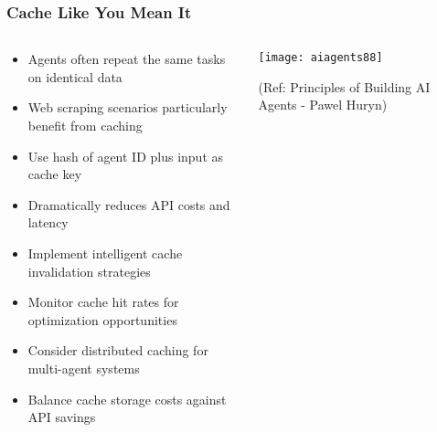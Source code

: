 \begin{frame}[fragile]\frametitle{Cache Like You Mean It}
\begin{columns}
    \begin{column}[T]{0.6\linewidth}
      \begin{itemize}
		\item Agents often repeat the same tasks on identical data
		\item Web scraping scenarios particularly benefit from caching
		\item Use hash of agent ID plus input as cache key
		\item Dramatically reduces API costs and latency
		\item Implement intelligent cache invalidation strategies
		\item Monitor cache hit rates for optimization opportunities
		\item Consider distributed caching for multi-agent systems
		\item Balance cache storage costs against API savings
	  \end{itemize}
    \end{column}
    \begin{column}[T]{0.4\linewidth}
		\begin{center}
		\texttt{[image: aiagents88]}
		
		{\tiny (Ref: Principles of Building AI Agents - Pawel Huryn)}
		\end{center}	
    \end{column}
  \end{columns}
\end{frame}

